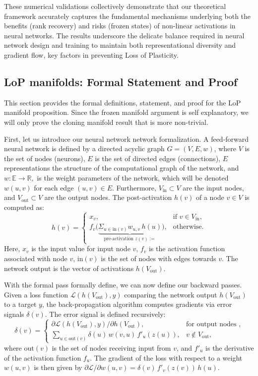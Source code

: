 \documentclass{article}
\newcommand{\Loss}{\mathcal{L}}
\newcommand{\R}{\mathbb{R}}
\newcommand{\E}{\mathbb{E}}
\numberwithin{figure}{section}
\begin{document}
These numerical validations collectively demonstrate that our theoretical framework accurately captures the fundamental mechanisms underlying both the benefits (rank recovery) and risks (frozen states) of non-linear activations in neural networks. The results underscore the delicate balance required in neural network design and training to maintain both representational diversity and gradient flow, key factors in preventing Loss of Plasticity.


\subsection{LoP manifolds: Formal Statement and Proof}
\label{app:cloning_manifold_details}

This section provides the formal definitions, statement, and proof for the LoP manifold proposition. Since the frozen manifold argument is self explanatory, we will only prove the cloning manifold result that is more non-trivial. 


First, let us introduce our neural network network formalization. 
A feed-forward neural network is defined by a directed acyclic graph $G=(V,E, w)$, where $V$ is the set of nodes (neurons), $E$ is the set of directed edges (connections), $E$ representations the structure of the computational graph of the network, and  $w:\E \to \R,$ is the weight parameters of the network, which will be denoted $w(u,v)$ for each edge $(u,v)\in E$. Furthermore, $V_{\text{in}} \subset V$ are the input nodes, and $V_{\text{out}} \subset V$ are the output nodes. The post-activation $h(v)$ of a node $v \in V$ is computed as:
\[
h(v)=
\begin{cases}
x_v, & \text{if } v\in V_{\text{in}},\\
f_v \Big(\underbrace{\Sigma_{u\in \text{in}(v)}w_{u,v}\,h(u)}_{\text{pre-activation }z(v):=}\Big), &\text{otherwise}.
\end{cases}
\]
Here, $x_v$ is the input value for input node $v$, $f_v$ is the activation function associated with node $v$, $\mathrm{in}(v)$ is the set of nodes with edges towards $v.$ The network output is the vector of activations $h(V_{\text{out}})$. 

With the formal pass formally define, we can now define our backward passes.  Given a loss function $\Loss(h(V_{\text{out}}),y)$ comparing the network output $h(V_{\text{out}})$ to a target $y$, the back-propagation algorithm computes gradients via error signals $\delta(v)$. The error signal is defined recursively:
\[
\delta(v)=
\begin{cases}
\partial\Loss(h(V_{\text{out}}),y)/\partial h(V_{\text{out}}), & \text{for output nodes },\\[4pt]
\displaystyle\sum_{u\in\mathrm{out}(v)}\delta(u)\,w(v,u)\,f'_u(z(u)), &v\notin V_{\text{out}},
\end{cases}
\]
where $\mathrm{out}(v)$ is the set of nodes receiving input from $v$, and $f'_u$ is the derivative of the activation function $f_u$. The gradient of the loss with respect to a weight $w(u,v)$ is then given by $\partial\Loss/\partial w(u,v)=\delta(v)\,f'_v(z(v))\,h(u)$.
\end{document}
